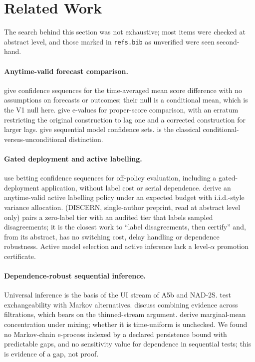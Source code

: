 \section{Related Work}\label{sec:related}

The search behind this section was not exhaustive; most items were checked at abstract level, and
those marked in \texttt{refs.bib} as unverified were seen second-hand. %

\paragraph{Anytime-valid forecast comparison.} \citet{choe2024comparing} give confidence sequences
for the time-averaged mean score difference with no assumptions on forecasts or outcomes; their null
is a conditional mean, which is the V1 null here. \citet{henzi2022valid} give e-values for proper-score
comparison, with an erratum restricting the original construction to lag one and a corrected
construction for larger lags. \citet{arnold2024sequential} give sequential model confidence sets.
\citet{giacomini2006tests} is the classical conditional-versus-unconditional distinction.

\paragraph{Gated deployment and active labelling.} \citet{karampatziakis2021offpolicy} use betting
confidence sequences for off-policy evaluation, including a gated-deployment application, without
label cost or serial dependence. \citet{xu2024active} derive an anytime-valid active labelling policy
under an expected budget with i.i.d.-style variance allocation. \citet{balachandran2026discern}
(DISCERN, single-author preprint, read at abstract level only) pairs a zero-label tier with an audited
tier that labels sampled disagreements; it is the closest work to ``label disagreements, then certify''
and, from its abstract, has no switching cost, delay handling or dependence robustness. Active model
selection \citep{karimi2021online,liu2024cams} and active inference \citep{zrnic2024active} lack a
level-$\alpha$ promotion certificate.

\paragraph{Dependence-robust sequential inference.} Universal inference
\citep{wasserman2020universal} is the basis of the UI stream of A5b and NAD-2S.
\citet{ramdas2021testing} test exchangeability with Markov alternatives. \citet{choe2024combining}
discuss combining evidence across filtrations, which bears on the thinned-stream argument.
\citet{yuan2025selfnormalized} derive marginal-mean concentration under mixing; whether it is
time-uniform is unchecked. We found no Markov-chain e-process indexed by a declared persistence bound
with predictable gaps, and no sensitivity value for dependence in sequential tests; this is evidence
of a gap, not proof.

